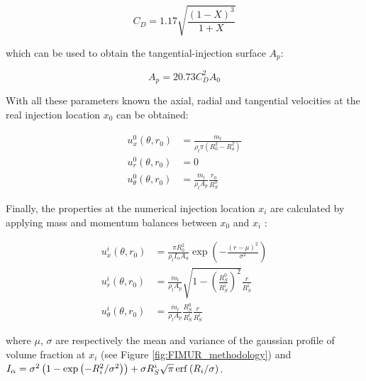 \begin{equation}
C_D = 1.17 \sqrt{\frac{\left( 1 - X \right)^3}{1 + X}}
\end{equation}

which can be used to obtain the tangential-injection surface $A_p$:

\begin{equation}
A_p = 20.73 C_D^2 A_0
\end{equation}

With all these parameters known the axial, radial and tangential velocities at the real injection location $x_0$ can be obtained:

\begin{subequations}
\label{eq:ch3_FIMUR_velocities_at_x0}
\begin{align}
u_x^0 \left( \theta, r_0 \right) &= \frac{\dot{m}_l}{\rho_l \pi \left( R_0^2 - R_a^2 \right)} \\
u_r^0 \left( \theta, r_0 \right) &= 0 \\
u_\theta^0 \left( \theta, r_0 \right) &= \frac{\dot{m}_l}{\rho_l A_p} \frac{r_0}{R_S^0} 
\end{align}
\end{subequations}

Finally, the properties at the numerical injection location $x_i$ are calculated by applying mass and momentum balances between $x_0$ and $x_i$ :

\begin{subequations}
\begin{align}
u_x^i \left( \theta, r_0 \right) &= \frac{\pi R_0^2}{\rho_l I_\alpha A_u} \exp \left( - \frac{\left( r - \mu \right)^2}{\sigma^2} \right) \\
u_r^i \left( \theta, r_0 \right) &= \frac{\dot{m}_l}{\rho_l A_p} \sqrt{1 - \left( \frac{R_S^0}{R_S^i}  \right)^2} \frac{r}{R_S^i} \\
u_\theta^i \left( \theta, r_0 \right) &= \frac{\dot{m}_l}{\rho_l A_p} \frac{R_S^0}{R_S^i} \frac{r}{R_S^i} 
\end{align}
\end{subequations}

where $\mu$, $\sigma$ are respectively the mean and variance of the gaussian profile of volume fraction at $x_i$ (see Figure \ref{fig:FIMUR_methodology}) and $I_\alpha = \sigma^2 \left( 1 - \exp \left( - R_i^2/\sigma^2 \right) \right) + \sigma R_S^i \sqrt{\pi} \operatorname{erf} \left( R_i / \sigma \right)$.


